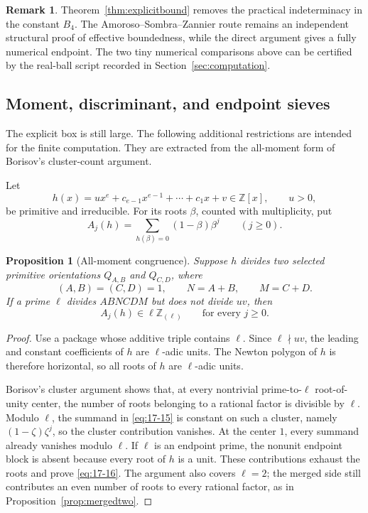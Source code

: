 \documentclass[11pt]{article}
\numberwithin{equation}{section}
\newtheorem{proposition}[theorem]{Proposition}
\theoremstyle{definition}
\newtheorem{remark}[theorem]{Remark}
\newcommand{\Z}{\mathbb Z}
\begin{document}
\begin{remark}
Theorem~\ref{thm:explicitbound} removes the practical indeterminacy in the
constant \(B_4\).  The Amoroso--Sombra--Zannier route remains an independent
structural proof of effective boundedness, while the direct argument gives a
fully numerical endpoint.  The two tiny numerical comparisons above can be
certified by the real-ball script recorded in
Section~\ref{sec:computation}.
\end{remark}

\subsection{Moment, discriminant, and endpoint sieves}
\label{subsec:momentsieves}

The explicit box is still large.  The following additional restrictions are
intended for the finite computation.  They are extracted from the all-moment
form of Borisov's cluster-count argument.

Let
\[
 h(x)=ux^e+c_{e-1}x^{e-1}+\cdots+c_1x+v\in\Z[x],
 \qquad u>0,
\]
be primitive and irreducible.  For its roots \(\beta\), counted with
multiplicity, put
\begin{equation}
 A_j(h)=\sum_{h(\beta)=0}(1-\beta)\beta^j
 \qquad(j\geq0).
 \label{eq:17-15}
\end{equation}

\begin{proposition}[All-moment congruence]\label{prop:momentcongruence}
Suppose \(h\) divides two selected primitive orientations
\(Q_{A,B}\) and \(Q_{C,D}\), where
\[
 (A,B)=(C,D)=1,
 \qquad N=A+B,
 \qquad M=C+D.
\]
If a prime \(\ell\) divides \(ABNCDM\) but does not divide \(uv\), then
\begin{equation}
 A_j(h)\in\ell\Z_{(\ell)}
 \qquad\text{for every }j\geq0.
 \label{eq:17-16}
\end{equation}
\end{proposition}

\begin{proof}
Use a package whose additive triple contains \(\ell\).  Since
\(\ell\nmid uv\), the leading and constant coefficients of \(h\) are
\(\ell\)-adic units.  The Newton polygon of \(h\) is therefore horizontal,
so all roots of \(h\) are \(\ell\)-adic units.

Borisov's cluster argument \cite[Lemma~3.1 and Remark~3.5]{Borisov1998}
shows that, at every nontrivial prime-to-\(\ell\) root-of-unity center, the
number of roots belonging to a rational factor is divisible by \(\ell\).
Modulo \(\ell\), the summand in \eqref{eq:17-15} is constant on such a cluster,
namely \((1-\zeta)\zeta^j\), so the cluster contribution vanishes.  At the
center \(1\), every summand already vanishes modulo \(\ell\).  If \(\ell\)
is an endpoint prime, the nonunit endpoint block is absent because every root
of \(h\) is a unit.  These contributions exhaust the roots and prove
\eqref{eq:17-16}.  The argument also covers \(\ell=2\); the merged side still
contributes an even number of roots to every rational factor, as in
Proposition~\ref{prop:mergedtwo}.
\end{proof}
\end{document}
